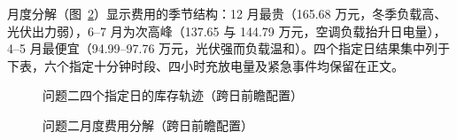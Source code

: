 月度分解（图~\ref{fig:fig_f07_q2_monthly}）显示费用的季节结构：12 月最贵（165.68 万元，冬季负载高、光伏出力弱），6--7 月为次高峰（137.65 与 144.79 万元，空调负载抬升日电量），4--5 月最便宜（94.99--97.76 万元，光伏强而负载温和）。四个指定日结果集中列于下表，六个指定十分钟时段、四小时充放电量及紧急事件均保留在正文。


\FloatBarrier

\begin{figure}[!htbp]\centering
{}
\caption{问题二四个指定日的库存轨迹（跨日前瞻配置）}\label{fig:fig_f15_q2_soc}
\end{figure}

\begin{figure}[!htbp]\centering
{}
\caption{问题二月度费用分解（跨日前瞻配置）}\label{fig:fig_f07_q2_monthly}
\end{figure}
